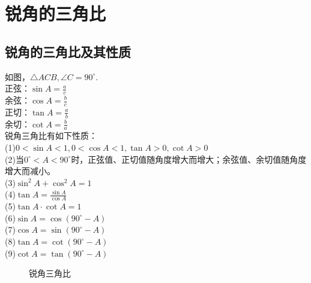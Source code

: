 \chapter{锐角的三角比}
\section{锐角的三角比及其性质}
\begin{theorem}
    如图，$\triangle ACB,\angle C=90^\circ$. \\
    正弦：$\sin A=\frac{a}{c}$ \\
    余弦：$\cos A=\frac{b}{c}$ \\
    正切：$\tan A=\frac{a}{b}$ \\
    余切：$\cot A=\frac{b}{a}$ \\
    锐角三角比有如下性质：\\
    (1)$0 < \sin A < 1, 0 < \cos A < 1, \tan A > 0, \cot A > 0$ \\
    (2)当$0^\circ < A < 90^\circ$时，正弦值、正切值随角度增大而增大；余弦值、余切值随角度增大而减小。\\
    (3)$\sin^2 A+\cos^2 A=1$ \\
    (4)$\tan A=\frac{\sin A}{\cos A}$ \\
    (5)$\tan A·\cot A=1$ \\
    (6)$\sin A=\cos(90^\circ-A)$ \\
    (7)$\cos A=\sin(90^\circ-A)$ \\
    (8)$\tan A=\cot(90^\circ-A)$ \\
    (9)$\cot A=\tan(90^\circ-A)$ \\
\end{theorem}
\begin{figure}[H]
    \centering
    \resizebox{4cm}{!}{}
    \caption{锐角三角比}
\end{figure}
\clearpage
